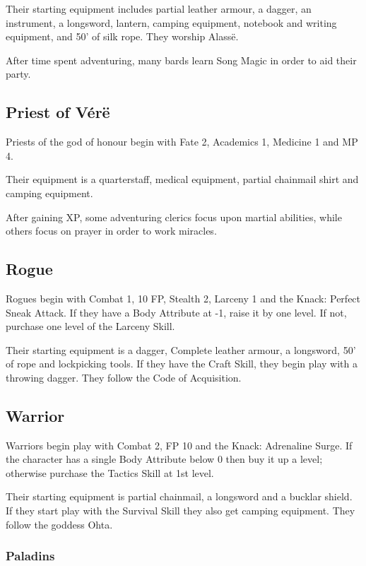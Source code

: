 Their starting equipment includes partial leather armour, a dagger, an instrument, a longsword, lantern, camping equipment, notebook and writing equipment, and 50' of silk rope.  They worship Alass\"{e}.

After time spent adventuring, many bards learn Song Magic in order to aid their party.

\subsection{Priest of V\'{e}r\"{e}}

Priests of the god of honour begin with Fate 2, Academics 1, Medicine 1 and MP 4.

Their equipment is a quarterstaff, medical equipment, partial chainmail shirt and camping equipment.

After gaining XP, some adventuring clerics focus upon martial abilities, while others focus on prayer in order to work miracles.

\subsection{Rogue}

Rogues begin with Combat 1, 10 FP, Stealth 2, Larceny 1 and the Knack: Perfect Sneak Attack.  If they have a Body Attribute at -1, raise it by one level.  If not, purchase one level of the Larceny Skill.

Their starting equipment is a dagger, Complete leather armour, a longsword, 50' of rope and lockpicking tools.  If they have the Craft Skill, they begin play with a throwing dagger.  They follow the Code of Acquisition.

\subsection{Warrior}

Warriors begin play with Combat 2, FP 10 and the Knack: Adrenaline Surge.  If the character has a single Body Attribute below 0 then buy it up a level; otherwise purchase the Tactics Skill at 1st level.

Their starting equipment is partial chainmail, a longsword and a bucklar shield.  If they start play with the Survival Skill they also get camping equipment.  They follow the goddess Ohta.

\subsubsection{Paladins}

